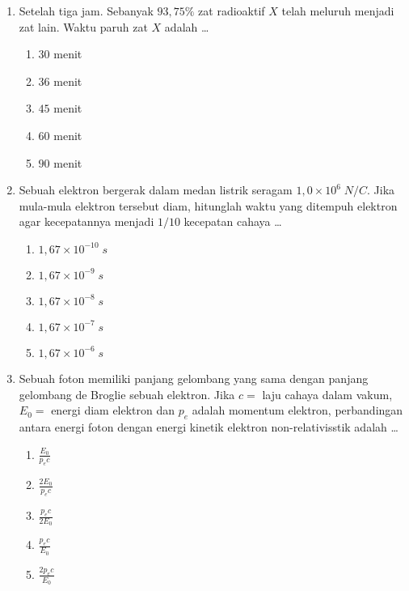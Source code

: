 \documentclass[A4,12PT, english, twocolumn]{journal}
\begin{document}
\begin{enumerate}
\item Setelah tiga jam. Sebanyak $93,75\%$ zat radioaktif $X$ telah meluruh menjadi zat lain. Waktu paruh zat $X$ adalah \dots
    \begin{enumerate}
        \item $30$ menit
        \item $36$ menit
        \item $45$ menit
        \item $60$ menit
        \item $90$ menit
    \end{enumerate}

\item Sebuah elektron bergerak dalam medan listrik seragam $1,0 \times 10^6 \; N/C$. Jika mula-mula elektron tersebut diam, hitunglah waktu yang ditempuh elektron agar kecepatannya menjadi $1/10$ kecepatan cahaya \dots 
    \begin{enumerate}
        \item $1,67 \times 10^{-10} \; s$
        \item $1,67 \times 10^{-9} \; s$
        \item $1,67 \times 10^{-8} \; s$
        \item $1,67 \times 10^{-7} \; s$
        \item $1,67 \times 10^{-6} \; s$
    \end{enumerate}

\item Sebuah foton memiliki panjang gelombang yang sama dengan panjang gelombang de Broglie sebuah elektron. Jika $c=$ laju cahaya dalam vakum, $E_0=$ energi diam elektron dan $p_e$ adalah momentum elektron, perbandingan antara energi foton dengan energi kinetik elektron non-relativisstik adalah \dots
    \begin{enumerate}
        \item $\frac{E_0}{p_ec}$
        \item $\frac{2E_0}{p_ec}$
        \item $\frac{p_ec}{2E_0}$
        \item $\frac{p_ec}{E_0}$
        \item $\frac{2p_ec}{E_0}$
    \end{enumerate}


\end{enumerate}
\end{document}
